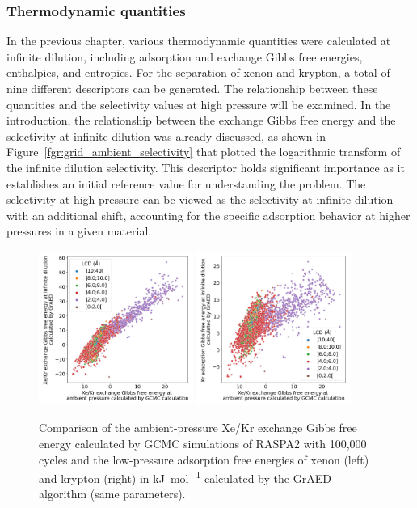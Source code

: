 \documentclass[main]{subfiles}
\begin{document}
\subsubsection{Thermodynamic quantities}

In the previous chapter, various thermodynamic quantities were calculated at infinite dilution, including adsorption and exchange Gibbs free energies, enthalpies, and entropies. For the separation of xenon and krypton, a total of nine different descriptors can be generated. The relationship between these quantities and the selectivity values at high pressure will be examined. In the introduction, the relationship between the exchange Gibbs free energy and the selectivity at infinite dilution was already discussed, as shown in Figure~\ref{fgr:grid_ambient_selectivity} that plotted the logarithmic transform of the infinite dilution selectivity. This descriptor holds significant importance as it establishes an initial reference value for understanding the problem. The selectivity at high pressure can be viewed as the selectivity at infinite dilution with an additional shift, accounting for the specific adsorption behavior at higher pressures in a given material.


\begin{figure}[ht]
  \centering
    \includegraphics[width=0.45\textwidth]{figures/3-fastsim/G_2080_vs_G_Xe_grid_overview.jpg}
    \hfill
    \includegraphics[width=0.45\textwidth]{figures/3-fastsim/G_2080_vs_G_Kr_grid_overview.jpg}
    \caption{Comparison of the ambient-pressure Xe/Kr exchange Gibbs free energy calculated by GCMC simulations of RASPA2 with 100,000 cycles and the low-pressure adsorption free energies of xenon (left) and krypton (right) in \si{\kilo\joule\per\mole} calculated by the GrAED algorithm (same parameters).}\label{fgr:grid_comp_gibbs}
\end{figure}
\end{document}

